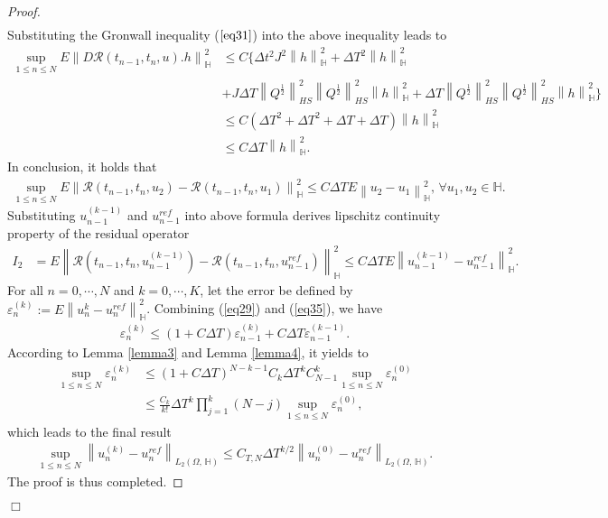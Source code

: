 \documentclass[preprint,12pt]{elsarticle}
\newtheorem{proof}{Proof}
\begin{document}
\begin{proof}
\begin{align*}
	\end{align*}
	Substituting the Gronwall inequality ($\ref{eq31}$) into the above inequality leads to
	\begin{align*}
		\sup\limits_{1\leq n \leq N}E\left\|D\mathcal{R}(t_{n-1},t_{n},u).h\right\|_{\mathbb{H}}^2
		&\leq C\{\Delta t^2 J^2 \left\|h\right\|_{\mathbb{H}}^2+\Delta T^2\left\|h\right\|_{\mathbb{H}}^2\\
		&+J\Delta T \left\|Q^{\frac{1}{2}}\right\|_{HS}^2\left\|Q^{\frac{1}{2}}\right\|_{HS}^2 \left\|h\right\|_{\mathbb{H}}^2+\Delta T\left\|Q^{\frac{1}{2}}\right\|_{HS}^2\left\|Q^{\frac{1}{2}}\right\|_{HS}^2\left\|h\right\|_{\mathbb{H}}^2\}\\
		&\leq C(\Delta T^2+\Delta T^2+\Delta T+\Delta T)\left\|h\right\|_{\mathbb{H}}^2\\
		&\leq C\Delta T\left\|h\right\|_{\mathbb{H}}^2.
	\end{align*}
	In conclusion, it holds that
	\begin{align}\label{eq34}
		\sup\limits_{1\leq n \leq N}E\left\|\mathcal{R}(t_{n-1},t_{n},u_{2})-\mathcal{R}(t_{n-1},t_{n},u_{1})\right\|_{\mathbb{H}}^2\leq C \Delta TE\left\|u_{2}-u_{1}\right\|_{\mathbb{H}}^2,\,\forall u_{1}, u_{2}\in \mathbb{H}.
	\end{align}
	Substituting $u_{n-1}^{(k-1)}$ and $u_{n-1}^{ref}$ into above formula derives lipschitz continuity property of the residual operator
	\begin{align}\label{eq35}
		I_{2}&=E\left\|\mathcal{R}(t_{n-1},t_{n},u_{n-1}^{(k-1)})-\mathcal{R}(t_{n-1},t_{n},u_{n-1}^{ref})\right\|_{\mathbb{H}}^2\leq C\Delta T E\left\|u_{n-1}^{(k-1)}-u_{n-1}^{ref}\right\|_{\mathbb{H}}^2.
	\end{align}
	For all $n = 0,\cdots,N$ and $k = 0,\cdots,K$, let the error be defined by 
	$\varepsilon _{n}^{(k)}:=	E\left\|u_{n}^{k}-u_{n}^{ref}\right\|_{\mathbb{H}}^2$. Combining (\ref{eq29}) and (\ref{eq35}), we have
	\begin{align*}
		\varepsilon _{n}^{(k)}
		\leq(1+C\Delta T)\varepsilon _{n-1}^{(k)}+C\Delta T \varepsilon _{n-1}^{(k-1)}.
	\end{align*}
	According to Lemma \ref{lemma3} and Lemma \ref{lemma4}, it yields to
	\begin{align*}
		\sup\limits_{1\leq n \leq N}	\varepsilon _{n}^{(k)} &\leq(1+C\Delta T)^{N-k-1}C_{k}\Delta T^{k} C_{N-1}^{k}\sup\limits_{1\leq n \leq N}	\varepsilon _{n}^{(0)}\\
		&\leq \frac{C_{k}}{k!} \Delta T^{k} \prod \limits_{j=1}^k (N-j)\sup\limits_{1\leq n \leq N}	\varepsilon _{n}^{(0)},		 
	\end{align*}
	which leads to the final result
	\begin{align*}
		\sup\limits_{1\leq n \leq N}\left\|u_{n}^{(k)}-u_{n}^{ref}\right\|_{L_{2}(\Omega,\,\mathbb{H})}\leq C_{T,N}\Delta T^{k/2} \left\|u_{n}^{(0)}-u_{n}^{ref}\right\|_{L_{2}(\Omega,\,\mathbb{H})}.
	\end{align*}
	The proof is thus completed.
\end{proof}\hfill $\Box$
\end{document}
